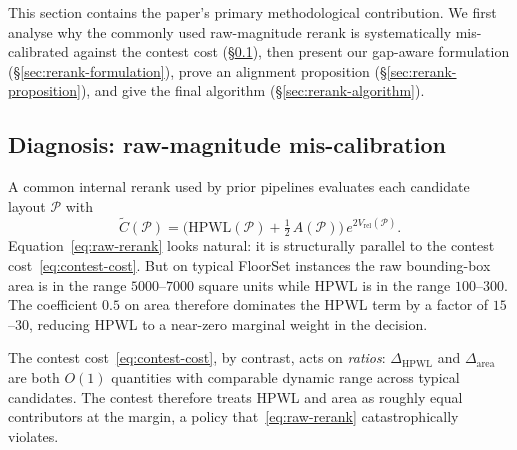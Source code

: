 \documentclass[nolineno]{ieeeaccess}
\begin{document}
This section contains the paper's primary methodological contribution.
We first analyse why the commonly used raw-magnitude rerank is
systematically mis-calibrated against the contest cost
(\S\ref{sec:rerank-diagnosis}), then present our gap-aware formulation
(\S\ref{sec:rerank-formulation}), prove an alignment proposition
(\S\ref{sec:rerank-proposition}), and give the final algorithm
(\S\ref{sec:rerank-algorithm}).

\subsection{Diagnosis: raw-magnitude mis-calibration}
\label{sec:rerank-diagnosis}

A common internal rerank used by prior pipelines evaluates each
candidate layout $\mathcal{P}$ with
\begin{equation}
\widetilde{C}(\mathcal{P}) = \bigl(\text{HPWL}(\mathcal{P})
     + \tfrac{1}{2}\,A(\mathcal{P})\bigr)\,e^{2 V_{\text{rel}}(\mathcal{P})}.
\label{eq:raw-rerank}
\end{equation}
Equation~\eqref{eq:raw-rerank} looks natural: it is structurally
parallel to the contest cost~\eqref{eq:contest-cost}. But on typical
FloorSet instances the raw bounding-box area is in the range
$5000$--$7000$ square units while HPWL is in the range $100$--$300$.
The coefficient $0.5$ on area therefore dominates the HPWL term by a
factor of $15$--$30$, reducing HPWL to a near-zero marginal weight in
the decision.

The contest cost~\eqref{eq:contest-cost}, by contrast, acts on
\emph{ratios}: $\Delta_{\text{HPWL}}$ and $\Delta_{\text{area}}$ are both
$O(1)$ quantities with comparable dynamic range across typical
candidates. The contest therefore treats HPWL and area as roughly
equal contributors at the margin, a policy that~\eqref{eq:raw-rerank}
catastrophically violates.
\end{document}
